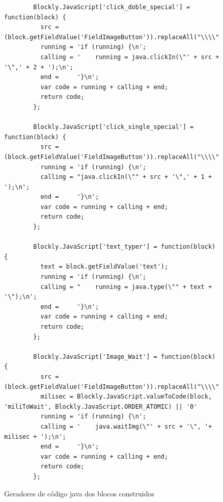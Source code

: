 \documentclass[tg]{mdtufsm}
\begin{document}
    \begin{figure}[!htb]
    \begin{lstlisting}
        Blockly.JavaScript['click_doble_special'] = function(block) {
          src = (block.getFieldValue('FieldImageButton')).replaceAll("\\\\","\\\\");
          running = 'if (running) {\n';
          calling = '    running = java.clickIn(\"' + src + '\",' + 2 + ');\n';
          end =     '}\n';
          var code = running + calling + end;
          return code;
        };

        Blockly.JavaScript['click_single_special'] = function(block) {
          src = (block.getFieldValue('FieldImageButton')).replaceAll("\\\\","\\\\");
          running = 'if (running) {\n';
          calling = "java.clickIn(\"" + src + '\",' + 1 + ');\n';
          end =     '}\n';
          var code = running + calling + end;
          return code;
        };

        Blockly.JavaScript['text_typer'] = function(block) {
          text = block.getFieldValue('text');
          running = 'if (running) {\n';
          calling = "    running = java.type(\"" + text + '\");\n';
          end =     '}\n';
          var code = running + calling + end;
          return code;
        };

        Blockly.JavaScript['Image_Wait'] = function(block) {
          src = (block.getFieldValue('FieldImageButton')).replaceAll("\\\\","\\\\");
          milisec = Blockly.JavaScript.valueToCode(block, 'miliToWait', Blockly.JavaScript.ORDER_ATOMIC) || '0'
          running = 'if (running) {\n';
          calling = '    java.waitImg(\"' + src + '\", '+ milisec + ');\n';
          end =     '}\n';
          var code = running + calling + end;
          return code;
        };
    \end{lstlisting}
        \caption{Geradores de código java dos blocos construidos}
        \label{code:myBlocksGenerator.js}
    \end{figure}
\end{document}
